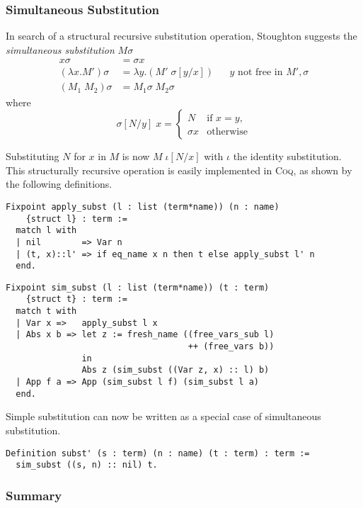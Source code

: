 \documentclass[a4paper,11pt]{article}
\newcommand{\name}[1]{\textsc{#1}\xspace}
\def\Coq{\name{Coq}}
\begin{document}
\subsubsection*{Simultaneous Substitution}

In search of a structural recursive substitution operation, Stoughton
\cite{stoughton-88} suggests the {\em simultaneous substitution} $M \sigma$
\begin{align*}
  x \sigma              &= \sigma x\\
  (\lambda x.M') \sigma &= \lambda y.(M' \; \sigma[y/x])  && \text{$y$ not free in $M', \sigma$}\\
  (M_1 \; M_2) \sigma   &= M_1 \sigma \; M_2 \sigma
\end{align*}
where
\begin{equation*}
  \sigma[N/y] \; x =
  \begin{cases}
    N        & \text{if $x = y$,}\\
    \sigma x & \text{otherwise}
  \end{cases}
\end{equation*}

Substituting $N$ for $x$ in $M$ is now $M \; \iota [N/x]$ with $\iota$
the identity substitution.
This structurally recursive operation is easily implemented in \Coq, as
shown by the following definitions.
\begin{lstlisting}
Fixpoint apply_subst (l : list (term*name)) (n : name)
    {struct l} : term :=
  match l with
  | nil        => Var n
  | (t, x)::l' => if eq_name x n then t else apply_subst l' n
  end.
\end{lstlisting}
\pagebreak[4]
\begin{lstlisting}
Fixpoint sim_subst (l : list (term*name)) (t : term)
    {struct t} : term :=
  match t with
  | Var x =>   apply_subst l x
  | Abs x b => let z := fresh_name ((free_vars_sub l)
                                    ++ (free_vars b))
               in
               Abs z (sim_subst ((Var z, x) :: l) b)
  | App f a => App (sim_subst l f) (sim_subst l a)
  end.
\end{lstlisting}
Simple substitution can now be written as a special case of
simultaneous substitution.
\begin{lstlisting}
Definition subst' (s : term) (n : name) (t : term) : term :=
  sim_subst ((s, n) :: nil) t.
\end{lstlisting}

\subsubsection*{Summary}
\end{document}
